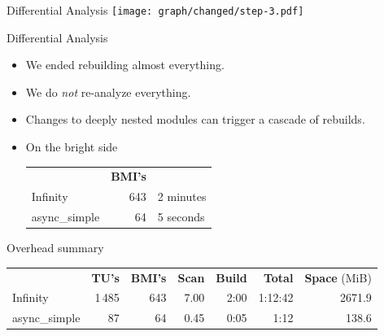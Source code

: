 \documentclass[]{beamer}
\begin{document}
\begin{frame}{Differential Analysis }
  \texttt{[image: graph/changed/step-3.pdf]}
\end{frame}


\begin{frame}{Differential Analysis}
  \begin{itemize}
    \item We ended rebuilding almost everything.
    \item We do \emph{not} re-analyze everything.
    \item Changes to deeply nested modules can trigger a cascade of rebuilds.
    \item On the bright side
          \begin{table}
            \begin{tabular}{l r l}
                            & \textbf{BMI's} &           \\
              Infinity      & 643            & 2 minutes \\
              async\_simple & 64             & 5 seconds
            \end{tabular}
          \end{table}
  \end{itemize}
\end{frame}

\begin{frame}{Overhead summary}
  \footnotesize\begin{table}
    \begin{tabular}{l r r r r r r}
                    & \textbf{TU's} & \textbf{BMI's} & \textbf{Scan} & \textbf{Build} & \textbf{Total} & \textbf{Space} (MiB) \\
      Infinity      & 1\,485        & 643            & 7.00          & 2:00           & 1:12:42        & 2671.9               \\
      async\_simple & 87            & 64             & 0.45          & 0:05           & 1:12           & 138.6
    \end{tabular}
  \end{table}
\end{frame}
\end{document}
